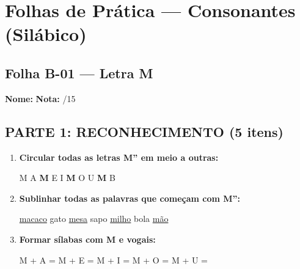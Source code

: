 
\section{Folhas de Prática --- Consonantes (Silábico)}


\subsection{Folha B-01 --- Letra M}

\begin{exercicio}

\noindent\textbf{Nome:} \underline{\hspace{4cm}} \quad \textbf{Nota:} \underline{\hspace{1cm}}/15

\subsection*{PARTE 1: RECONHECIMENTO (5 itens)}

\begin{enumerate}
  \item \textbf{Circular todas as letras M'' em meio a outras:}
  \begin{center}
  M \quad A \quad \textbf{M} \quad E \quad I \quad \textbf{M} \quad O \quad U \quad \textbf{M} \quad B
  \end{center}

  \item \textbf{Sublinhar todas as palavras que começam com M'':}
  \begin{center}
  \uline{macaco} \quad gato \quad \uline{mesa} \quad sapo \quad \uline{milho} \quad bola \quad \uline{mão}
  \end{center}

  \item \textbf{Formar sílabas com M e vogais:}
  \begin{center}
  M + A = \underline{\hspace{1.5cm}} \quad M + E = \underline{\hspace{1.5cm}} \quad M + I = \underline{\hspace{1.5cm}} \quad M + O = \underline{\hspace{1.5cm}} \quad M + U = \underline{\hspace{1.5cm}}
  \end{center}


\end{enumerate}
\end{exercicio}
